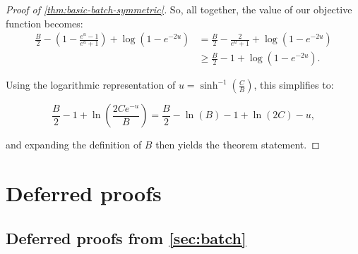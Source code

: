 \documentclass{article}
\begin{document}
\begin{proof}[Proof of \cref{thm:basic-batch-symmetric}]
    So, all together, the value of our objective function becomes:
    \begin{align*}
        \frac{B}{2} - \left(1-\frac{e^u-1}{e^u+1}\right) + \log(1-e^{-2u})
        &= \frac{B}{2} - \frac{2}{e^u+1} + \log(1-e^{-2u}) \\
        &\geq \frac{B}{2} - 1 + \log(1-e^{-2u}).
    \end{align*}

    Using the logarithmic representation of $u = \sinh^{-1}\left( \frac{C}{B} \right)$, this simplifies to:

    \begin{equation*}
        \frac{B}{2}-1+\ln \left(\frac{2C e^{-u}}{B}\right) = \frac{B}{2} - \ln(B) -1 +\ln \left(2C\right) - u,
    \end{equation*}

    and expanding the definition of $B$ then yields the theorem statement.
\end{proof}


\section{Deferred proofs}
\label{sec:deferred_proofs}

\subsection{Deferred proofs from \cref{sec:batch}}
\label{sec:deferred_batch}
\end{document}
